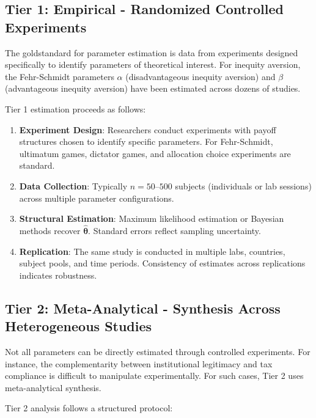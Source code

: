 \documentclass[12pt,oneside]{book}
\begin{document}
\subsection{Tier 1: Empirical - Randomized Controlled Experiments}

The goldstandard for parameter estimation is data from experiments designed specifically to
identify parameters of theoretical interest. For inequity aversion, the Fehr-Schmidt parameters
$\alpha$ (disadvantageous inequity aversion) and $\beta$ (advantageous inequity aversion) have
been estimated across dozens of studies.

Tier 1 estimation proceeds as follows:

\begin{enumerate}

  \item \textbf{Experiment Design}: Researchers conduct experiments with payoff structures chosen
        to identify specific parameters. For Fehr-Schmidt, ultimatum games, dictator games, and
        allocation choice experiments are standard.

  \item \textbf{Data Collection}: Typically $n = 50$--$500$ subjects (individuals or lab sessions)
        across multiple parameter configurations.

  \item \textbf{Structural Estimation}: Maximum likelihood estimation or Bayesian methods recover
        $\hat{\boldsymbol{\theta}}$. Standard errors reflect sampling uncertainty.

  \item \textbf{Replication}: The same study is conducted in multiple labs, countries, subject pools,
        and time periods. Consistency of estimates across replications indicates robustness.

\end{enumerate}

\subsection{Tier 2: Meta-Analytical - Synthesis Across Heterogeneous Studies}

Not all parameters can be directly estimated through controlled experiments. For instance,
the complementarity between institutional legitimacy and tax compliance is difficult to manipulate
experimentally. For such cases, Tier 2 uses meta-analytical synthesis.

Tier 2 analysis follows a structured protocol:
\end{document}
